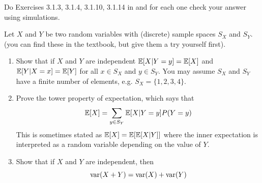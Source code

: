 \begin{exercise}[\ding{111}]
Do Exercises 3.1.3, 3.1.4, 3.1.10, 3.1.14  in  \cite{evans} and for each one check your answer using simulations. 
\end{exercise}

\begin{exercise}
Let $X$ and $Y$ be two random variables with (discrete) sample spaces $S_X$ and $S_Y$.  (you can find these in the textbook, but give them a try yourself first). 
\begin{enumerate}[label=(\alph*)]
\item Show that if $X$ and $Y$ are independent $\mathbb E[X|Y=y]=\mathbb E[X]$ and $\mathbb E[Y|X=x]=\mathbb E[Y]$ for all $x \in S_X$ and $y \in S_Y$.  You may assume $S_X$ and $S_Y$ have a finite number of elements, e.g. $S_X = \{1,2,3,4\}$. 
\item Prove the tower property of expectation, which says that 
\begin{equation*}
\mathbb E[X] = \sum_{y \in S_Y}\mathbb E[X|Y=y]P(Y=y)
\end{equation*} 
This is sometimes stated as $\mathbb E[X] = \mathbb E[\mathbb E[X|Y]]$ where the inner expectation is interpreted as a random variable depending on the value of $Y$. 
\item Show that if $X$ and $Y$ are independent, then 
\begin{equation*}
{\rm var}(X+Y) = {\rm var}(X) + {\rm var}(Y)
\end{equation*} 

\end{enumerate}
\end{exercise}





